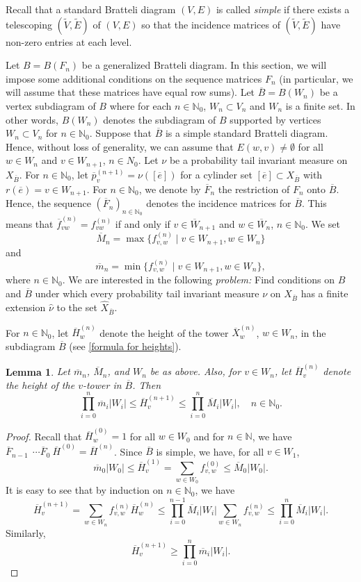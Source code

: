 \documentclass[11pt,reqno]{amsart}
\theoremstyle{definition}
\theoremstyle{remark}
\theoremstyle{plain}
\newtheorem{lemma}[definition]{Lemma}
\def\ol{\overline}
\def\ov{\overline}
\def\wh{\widehat}
\newcommand{\N}{\mathbb N}
\numberwithin{equation}{section}
\begin{document}
Recall that a standard Bratteli diagram $(V,E)$ is called \textit{simple} if there exists a telescoping $(\widetilde{V},\widetilde{E})$ of
$(V,E)$ so that the incidence matrices of $(\widetilde{V},\widetilde{E})$ have non-zero entries at each level. 

Let $B = B(F_n)$ be a generalized Bratteli diagram. In this section, we will impose some additional conditions on the sequence matrices $F_n$ (in particular, we will assume that these matrices have equal row sums). Let $\ov B = B(W_n)$ be a vertex subdiagram of $B$ where for each $n \in \N_0$, $W_n \subset V_n$ 
and $W_n$ is a finite set. In other words, $B(W_n)$ denotes the subdiagram of $B$ supported by vertices $W_n \subset V_n$ for $n \in \N_0$. Suppose that $\ol B$ is a simple standard Bratteli diagram. 
Hence, without loss of generality, we can assume that $E(w, v) \neq \emptyset$ for all $w \in W_n$ and $v \in W_{n+1}$, $n \in N_0$. Let $\nu$ be a probability tail invariant measure on $X_{\ov B}$. For $n \in \N_0$, let $\ov p_v^{(n+1)} = \nu([\ov e])$ for a cylinder set $[\ov e] \subset X_{\ov B}$ with $r(\ov e) = v \in W_{n+1}$. For $n \in \N_0$, we denote by $\ov F_n$ the restriction of $F_n$ onto $\ov B$. Hence, the sequence $(\ol F_n)_{n \in \N_0}$ denotes the incidence matrices for $\ol B$.
This means that $\ol f^{(n)}_{v w} = f^{(n)}_{v w}$ if and only if
$v \in \ol W_{n+1}$ and $w \in \ol W_n$, $n \in \N_0$.
We set
$$
\ov M_n = \max\{f_{v,w}^{(n)} \;| \; v \in W_{n+1}, w \in W_n\}
$$
and 
$$
\ov m_n = \min\{f_{v,w}^{(n)} \; |\;  v \in W_{n+1}, w \in W_n\},
$$
where $n \in \N_0$. 
We are interested in the following \textit{problem:} Find conditions on $B$ and $\ov B$ under which every probability tail invariant measure $\nu$ on $X_{\ov B}$ has a finite extension $\wh \nu$ to the set $\wh X_{\ov B}$.

For $n \in \N_0$, let $\ov H_w^{(n)}$ denote the height of the tower $\ov X_w^{(n)}$, $w \in W_n$, in the subdiagram $\ov B$ (see \eqref{formula for heights}).

\begin{lemma}\label{claim:bd_heighs}  Let $\ov m_n$, $\ov M_n$, and $W_n$ be as above. Also, for $v \in W_n$, let $\ov H_v^{(n)}$ denote the height of the $v$-tower in $\ol B$. Then
    $$
    \prod_{i = 0}^n \ov m_i |W_i| \leq \ov H_v^{(n+1)} \leq \prod_{i = 0}^n \ov M_i |W_i|,\quad n\in \N_0.
    $$    
\end{lemma}

\begin{proof}
Recall that $\ov H_w^{(0)} = 1$ for all $w \in W_0$ and for $n \in \N$, we have $\ov F_{n-1} \ \ \cdots \ov F_0\  \ov H^{(0)} = \ov H^{(n)}$. Since $\ov B$ is simple, we have, for all $v \in W_1$, 
    $$
    \ov m_0 |W_0| \leq \ov H_v^{(1)} = \sum_{w \in W_0} f_{v,w}^{(0)} \leq \ov M_0 |W_0|.
    $$
    It is easy to see that by induction on $n \in \N_0$, we have
    $$
    \ov H_v^{(n+1)} = \sum_{w \in W_n} f_{v,w}^{(n)}\ov H_w^{(n)} \leq \prod_{i = 0}^{n-1}\ov M_i|W_i|\sum_{w \in W_n} f_{v,w}^{(n)} \leq \prod_{i = 0}^n \ov M_i |W_i|.
    $$
    Similarly,
    $$
    \ov H_v^{(n+1)} \geq \prod_{i = 0}^n \ov m_i |W_i|.
    $$
\end{proof}
\end{document}
